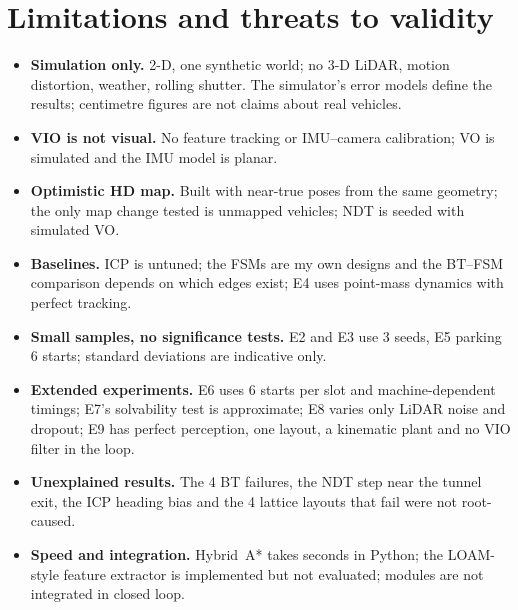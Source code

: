 \documentclass[11pt,a4paper]{article}
\begin{document}
\section{Limitations and threats to validity}\label{sec:limits}
\begin{itemize}
\item \textbf{Simulation only.} 2-D, one synthetic world; no 3-D LiDAR, motion distortion, weather, rolling shutter. The simulator's error models define the results; centimetre figures are not claims about real vehicles.
\item \textbf{VIO is not visual.} No feature tracking or IMU--camera calibration; VO is simulated and the IMU model is planar.
\item \textbf{Optimistic HD map.} Built with near-true poses from the same geometry; the only map change tested is unmapped vehicles; NDT is seeded with simulated VO.
\item \textbf{Baselines.} ICP is untuned; the FSMs are my own designs and the BT--FSM comparison depends on which edges exist; E4 uses point-mass dynamics with perfect tracking.
\item \textbf{Small samples, no significance tests.} E2 and E3 use 3 seeds, E5 parking 6 starts; standard deviations are indicative only.
\item \textbf{Extended experiments.} E6 uses 6 starts per slot and machine-dependent timings; E7's solvability test is approximate; E8 varies only LiDAR noise and dropout; E9 has perfect perception, one layout, a kinematic plant and no VIO filter in the loop.
\item \textbf{Unexplained results.} The 4 BT failures, the NDT step near the tunnel exit, the ICP heading bias and the 4 lattice layouts that fail were not root-caused.
\item \textbf{Speed and integration.} Hybrid~A* takes seconds in Python; the LOAM-style feature extractor is implemented but not evaluated; modules are not integrated in closed loop.
\end{itemize}
\end{document}
